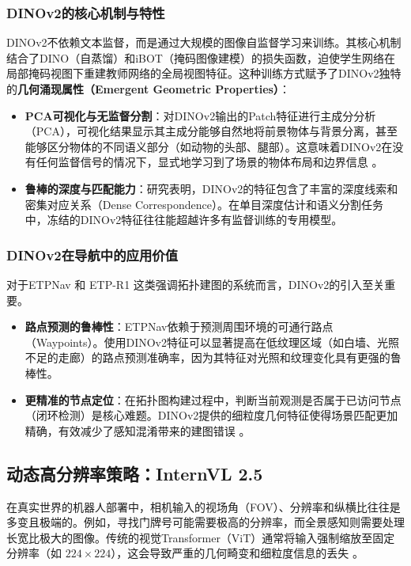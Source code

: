 \subsubsection{DINOv2的核心机制与特性}
DINOv2不依赖文本监督，而是通过大规模的图像自监督学习来训练。其核心机制结合了DINO（自蒸馏）和iBOT（掩码图像建模）的损失函数，迫使学生网络在局部掩码视图下重建教师网络的全局视图特征。这种训练方式赋予了DINOv2独特的\textbf{几何涌现属性（Emergent Geometric Properties）}：
\begin{itemize}
    \item \textbf{PCA可视化与无监督分割}：对DINOv2输出的Patch特征进行主成分分析（PCA），可视化结果显示其主成分能够自然地将前景物体与背景分离，甚至能够区分物体的不同语义部分（如动物的头部、腿部）。这意味着DINOv2在没有任何监督信号的情况下，显式地学习到了场景的物体布局和边界信息 \cite{dinov2_analysis}。
    \item \textbf{鲁棒的深度与匹配能力}：研究表明，DINOv2的特征包含了丰富的深度线索和密集对应关系（Dense Correspondence）。在单目深度估计和语义分割任务中，冻结的DINOv2特征往往能超越许多有监督训练的专用模型。
\end{itemize}

\subsubsection{DINOv2在导航中的应用价值}
对于ETPNav   和 ETP-R1   这类强调拓扑建图的系统而言，DINOv2的引入至关重要。
\begin{itemize}
    \item \textbf{路点预测的鲁棒性}：ETPNav依赖于预测周围环境的可通行路点（Waypoints）。使用DINOv2特征可以显著提高在低纹理区域（如白墙、光照不足的走廊）的路点预测准确率，因为其特征对光照和纹理变化具有更强的鲁棒性。
    \item \textbf{更精准的节点定位}：在拓扑图构建过程中，判断当前观测是否属于已访问节点（闭环检测）是核心难题。DINOv2提供的细粒度几何特征使得场景匹配更加精确，有效减少了感知混淆带来的建图错误 \cite{nav_r1}。
\end{itemize}

\subsection{动态高分辨率策略：InternVL 2.5}
在真实世界的机器人部署中，相机输入的视场角（FOV）、分辨率和纵横比往往是多变且极端的。例如，寻找门牌号可能需要极高的分辨率，而全景感知则需要处理长宽比极大的图像。传统的视觉Transformer（ViT）通常将输入强制缩放至固定分辨率（如 $224 \times 224$），这会导致严重的几何畸变和细粒度信息的丢失  。

